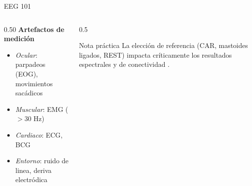 \begin{frame}{EEG 101}
  \begin{columns}[T]
    \begin{column}{0.50\textwidth}
      \textbf{Artefactos de medición}
\begin{itemize}
	\item \textit{Ocular}: parpadeos (EOG), movimientos sacádicos
	\item \textit{Muscular}: EMG ($>$30 Hz)
	\item \textit{Cardiaco}: ECG, BCG
	\item \textit{Entorno}: ruido de linea, deriva electródica
\end{itemize}
    \end{column}
    \begin{column}{0.5\textwidth}
      \vspace{0.3em}
      \begin{block}{Nota práctica}
        \small La elección de referencia (CAR, mastoides ligados, REST) impacta críticamente los resultados espectrales y de conectividad \cite{Yao2001}.
      \end{block}
    \end{column}
  \end{columns}
\end{frame}
